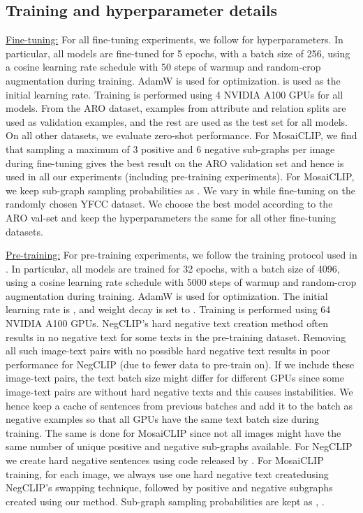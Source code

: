 \documentclass[11pt]{article}
\newcommand{\methodcomp}{MosaiCLIP}
\newcommand{\negclip}{NegCLIP}
\begin{document}
\begin{table}[h!]
\subsection{Training and hyperparameter details}
\label{hyperparams}
\underline{Fine-tuning:} For all fine-tuning experiments, we follow \citet{yuksekgonul2022and} for hyperparameters. In particular, all models are fine-tuned for 5 epochs, with a batch size of 256, using a cosine learning rate schedule with 50 steps of warmup and random-crop augmentation during training. AdamW is used for optimization.  is used as the initial learning rate. Training is performed using 4 NVIDIA A100 GPUs for all models. From the ARO dataset,  examples from attribute and relation splits are used as validation examples, and the rest are used as the test set for all models. On all other datasets, we evaluate zero-shot performance. For \methodcomp{}, we find that sampling a maximum of 3 positive and 6 negative sub-graphs per image during fine-tuning gives the best result on the ARO validation set and hence is used in all our experiments (including pre-training experiments). 
For \methodcomp{}, we keep sub-graph sampling probabilities as . We vary  in  while fine-tuning on the randomly chosen YFCC dataset. We choose the best model according to the ARO val-set and keep the hyperparameters the same for all other fine-tuning datasets.

\noindent\underline{Pre-training:} For pre-training experiments, we follow the training protocol used in \citet{yang2022unified, radford2021learning}. In particular, all models are trained for 32 epochs, with a batch size of 4096, using a cosine learning rate schedule with 5000 steps of warmup and random-crop augmentation during training. AdamW is used for optimization. The initial learning rate is , and weight decay is set to . Training is performed using 64 NVIDIA A100 GPUs.
\negclip{}'s hard negative text creation method often results in no negative text for some texts in the pre-training dataset. Removing all such image-text pairs with no possible hard negative text results in poor performance for \negclip{} (due to fewer data to pre-train on). If we include these image-text pairs, the text batch size might differ for different GPUs since some image-text pairs are without hard negative texts and this causes instabilities. We hence keep a cache of sentences from previous batches and add it to the batch as negative examples so that all GPUs have the same text batch size during training. The same is done for \methodcomp{} since not all images might have the same number of unique positive and negative sub-graphs available. For \negclip{} we create hard negative sentences using code released by \citep{yuksekgonul2022and}. For \methodcomp{} training, for each image, we always use one hard negative text createdusing \negclip{}'s swapping technique, followed by positive and negative subgraphs created using our method. Sub-graph sampling probabilities are kept as , .

\end{table}
\end{document}
